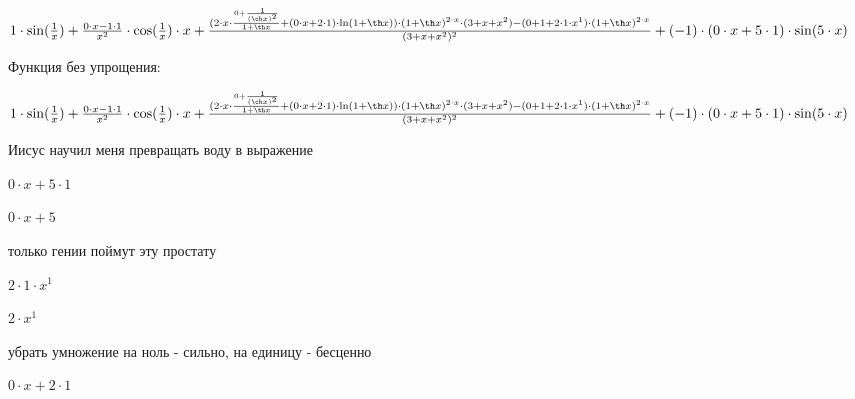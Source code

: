 \documentclass[a4paper,12pt]{article}
\begin{document}
\begin{center}$1 \cdot  \sin ( \frac{1}{x} )+ \frac{0 \cdot x-1 \cdot 1}{x^{2}}  \cdot  \cos ( \frac{1}{x} ) \cdot x+ \frac{(2 \cdot x \cdot  \frac{0+ \frac{1}{( \ch x)^{2}} }{1+ \th x} +(0 \cdot x+2 \cdot 1) \cdot  \ln (1+ \th x)) \cdot (1+ \th x)^{2 \cdot x} \cdot (3+x+x^{2})-(0+1+2 \cdot 1 \cdot x^{1}) \cdot (1+ \th x)^{2 \cdot x}}{(3+x+x^{2})^{2}} +(-1) \cdot (0 \cdot x+5 \cdot 1) \cdot  \sin (5 \cdot x)$

\end{center}

Функция без упрощения:



\begin{center}$1 \cdot  \sin ( \frac{1}{x} )+ \frac{0 \cdot x-1 \cdot 1}{x^{2}}  \cdot  \cos ( \frac{1}{x} ) \cdot x+ \frac{(2 \cdot x \cdot  \frac{0+ \frac{1}{( \ch x)^{2}} }{1+ \th x} +(0 \cdot x+2 \cdot 1) \cdot  \ln (1+ \th x)) \cdot (1+ \th x)^{2 \cdot x} \cdot (3+x+x^{2})-(0+1+2 \cdot 1 \cdot x^{1}) \cdot (1+ \th x)^{2 \cdot x}}{(3+x+x^{2})^{2}} +(-1) \cdot (0 \cdot x+5 \cdot 1) \cdot  \sin (5 \cdot x)$

\end{center}

Иисус научил меня превращать воду в выражение 



\begin{center}$0 \cdot x+5 \cdot 1$

\end{center}



\begin{center}$0 \cdot x+5$

\end{center}

только гении поймут эту простату 



\begin{center}$2 \cdot 1 \cdot x^{1}$

\end{center}



\begin{center}$2 \cdot x^{1}$

\end{center}

убрать умножение на ноль - сильно, на единицу - бесценно 



\begin{center}$0 \cdot x+2 \cdot 1$

\end{center}
\end{document}
